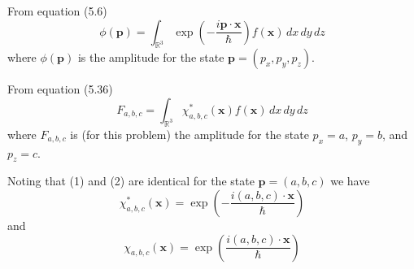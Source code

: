 


\bigskip
From equation (5.6)
\begin{equation*}
\phi(\mathbf p)=\int_{\mathbb R^3}\exp\left(-\frac{i\mathbf p\cdot\mathbf x}{\hbar}\right)f(\mathbf x)\,dx\,dy\,dz
\tag{1}
\end{equation*}
where $\phi(\mathbf p)$ is the amplitude for the state $\mathbf p=(p_x,p_y,p_z)$.

\bigskip
From equation (5.36)
\begin{equation*}
F_{a,b,c}=\int_{\mathbb R^3}\chi_{a,b,c}^*(\mathbf x)f(\mathbf x)\,dx\,dy\,dz
\tag{2}
\end{equation*}
where $F_{a,b,c}$ is (for this problem) the amplitude for the state $p_x=a$, $p_y=b$, and $p_z=c$.

\bigskip
Noting that (1) and (2) are identical for the state $\mathbf p=(a,b,c)$ we have
\begin{equation*}
\chi_{a,b,c}^*(\mathbf x)=\exp\left(-\frac{i(a,b,c)\cdot\mathbf x}{\hbar}\right)
\end{equation*}
and
\begin{equation*}
\chi_{a,b,c}(\mathbf x)=\exp\left(\frac{i(a,b,c)\cdot\mathbf x}{\hbar}\right)
\end{equation*}



